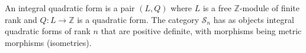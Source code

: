 An integral quadratic form is a pair $(L, Q)$ where $L$ is a free $\mathbb{Z}$-module of finite rank and $Q: L \to \mathbb{Z}$ is a quadratic form. The category $\mathcal{S}_n$ has as objects integral quadratic forms of rank $n$ that are positive definite, with morphisms being metric morphisms (isometries).
